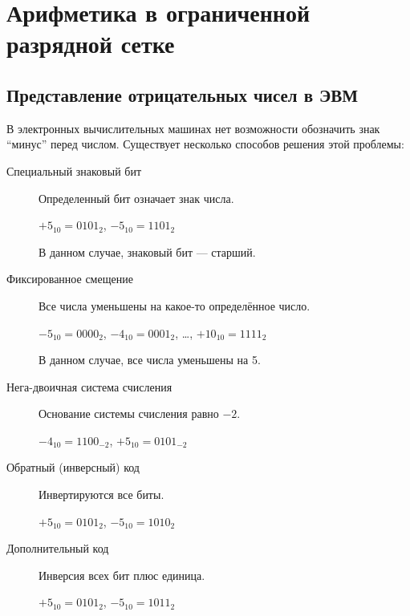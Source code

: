 \section{Арифметика в ограниченной разрядной сетке}\label{sec:limited-arithmetics}

\subsection{Представление отрицательных чисел в ЭВМ}\label{subsec:negative-numbers-representation}

В электронных вычислительных машинах нет возможности обозначить знак \enquote{минус} перед числом. Существует несколько способов решения этой проблемы:

\begin{description}
    \item [Специальный знаковый бит]
          Определенный бит означает знак числа.

          \ex%
          $+5_{10} = 0101_{2}$, $-5_{10} = 1101_{2}$

          В данном случае, знаковый бит --- старший.
    \item [Фиксированное смещение]
          Все числа уменьшены на какое-то определённое число.

          \ex%
          $-5_{10} = 0000_{2}$, $-4_{10} = 0001_{2}$, \dots, $+10_{10} = 1111_{2}$

          В данном случае, все числа уменьшены на 5.
    \item [Нега-двоичная система счисления]
          Основание системы счисления равно $-2$.

          \ex%
          $-4_{10} = 1100_{-2}$, $+5_{10} = 0101_{-2}$
    \item [Обратный (инверсный) код]
          Инвертируются все биты.

          \ex%
          $+5_{10} = 0101_{2}$, $-5_{10} = 1010_{2}$
    \item [Дополнительный код]
          Инверсия всех бит плюс единица.

          \ex%
          $+5_{10} = 0101_{2}$, $-5_{10} = 1011_{2}$
\end{description}

